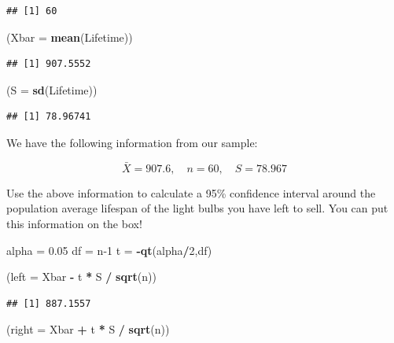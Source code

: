 \documentclass[
]{book}
\newenvironment{Shaded}{\begin{snugshade}}{\end{snugshade}}
\newcommand{\AttributeTok}[1]{\textcolor[rgb]{0.13,0.29,0.53}{#1}}
\newcommand{\DecValTok}[1]{\textcolor[rgb]{0.00,0.00,0.81}{#1}}
\newcommand{\FloatTok}[1]{\textcolor[rgb]{0.00,0.00,0.81}{#1}}
\newcommand{\FunctionTok}[1]{\textcolor[rgb]{0.13,0.29,0.53}{\textbf{#1}}}
\newcommand{\NormalTok}[1]{#1}
\newcommand{\OtherTok}[1]{\textcolor[rgb]{0.56,0.35,0.01}{#1}}
\newcommand{\SpecialCharTok}[1]{\textcolor[rgb]{0.81,0.36,0.00}{\textbf{#1}}}
\begin{document}
\begin{verbatim}
## [1] 60
\end{verbatim}

\begin{Shaded}
\begin{Highlighting}[]
\NormalTok{(}\AttributeTok{Xbar =} \FunctionTok{mean}\NormalTok{(Lifetime))}
\end{Highlighting}
\end{Shaded}

\begin{verbatim}
## [1] 907.5552
\end{verbatim}

\begin{Shaded}
\begin{Highlighting}[]
\NormalTok{(}\AttributeTok{S =} \FunctionTok{sd}\NormalTok{(Lifetime))}
\end{Highlighting}
\end{Shaded}

\begin{verbatim}
## [1] 78.96741
\end{verbatim}

We have the following information from our sample:

\[\bar{X}=907.6, \quad n = 60, \quad S = 78.967\]

Use the above information to calculate a 95\% confidence interval around the population average lifespan of the light bulbs you have left to sell. You can put this information on the box!

\begin{Shaded}
\begin{Highlighting}[]
\NormalTok{alpha }\OtherTok{=} \FloatTok{0.05}
\NormalTok{df }\OtherTok{=}\NormalTok{ n}\DecValTok{{-}1}
\NormalTok{t }\OtherTok{=} \SpecialCharTok{{-}}\FunctionTok{qt}\NormalTok{(alpha}\SpecialCharTok{/}\DecValTok{2}\NormalTok{,df)}

\NormalTok{(}\AttributeTok{left =}\NormalTok{ Xbar }\SpecialCharTok{{-}}\NormalTok{ t }\SpecialCharTok{*}\NormalTok{ S }\SpecialCharTok{/} \FunctionTok{sqrt}\NormalTok{(n))}
\end{Highlighting}
\end{Shaded}

\begin{verbatim}
## [1] 887.1557
\end{verbatim}

\begin{Shaded}
\begin{Highlighting}[]
\NormalTok{(}\AttributeTok{right =}\NormalTok{ Xbar }\SpecialCharTok{+}\NormalTok{ t }\SpecialCharTok{*}\NormalTok{ S }\SpecialCharTok{/} \FunctionTok{sqrt}\NormalTok{(n))}
\end{Highlighting}
\end{Shaded}
\end{document}
